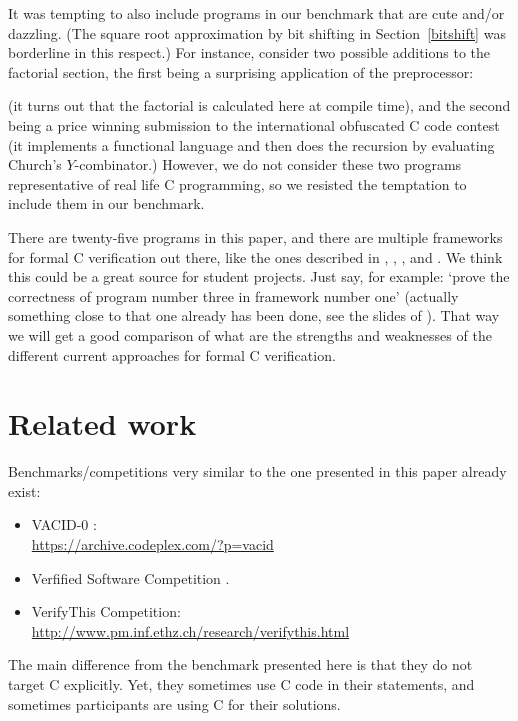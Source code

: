 \documentclass{article}
\begin{document}
It was tempting to also include programs in our benchmark that are cute and/or dazzling.
(The square root approximation by bit shifting in Section~\ref{bitshift} was borderline in this respect.)
For instance, consider two possible additions to the factorial
section,
the first being a surprising application of the preprocessor:


(it turns out that the factorial is calculated here at compile time),
and the second being a price winning submission to the international
obfuscated C code contest
(it implements a functional language and then does the recursion by
evaluating Church's $Y$-combinator.)
However, we do not consider these two programs representative of
real life C programming, so we resisted the temptation to include them in our benchmark.

There are twenty-five programs in this paper, and there are multiple
frameworks for formal C verification out there, like the ones described
in \cite{app:11}, \cite{cor:cuo:kir:mar:pre:puc:sig:yak:18}, \cite{dah:mos:san:tob:sch:09}, \cite{gre:and:klei:12} and \cite{jac:sma:phi:vog:pen:pie:11}.
We think this could be a great source for student projects.
Just say, for example: `prove the correctness of program number three in framework
number one' (actually something close to that one already has been done, see the slides of \cite{wie:16:1}).
That way we will get a good comparison of what are the strengths and
weaknesses of the different current approaches for formal C verification.

\section{Related work}

Benchmarks/competitions very similar to the one presented in this paper
already exist:
\begin{itemize}
\item
VACID-0 \cite{lei:mos:10}: \\
\url{https://archive.codeplex.com/?p=vacid}

\item
Verfified Software Competition \cite{fil:pas:stu:12,kle:mul:sha:lea:wus:alk:art:bro:cha:coh:hil:jac:lei:mon:pie:pol:rid:sma:tob:tue:ulb:wei:11}. %

\item
VerifyThis Competition: \\
\url{http://www.pm.inf.ethz.ch/research/verifythis.html}

\end{itemize}
The main difference from the benchmark
presented here is that they do not target C explicitly.
Yet, they sometimes use C code in their statements, and sometimes
participants are using C for their solutions.
\end{document}

